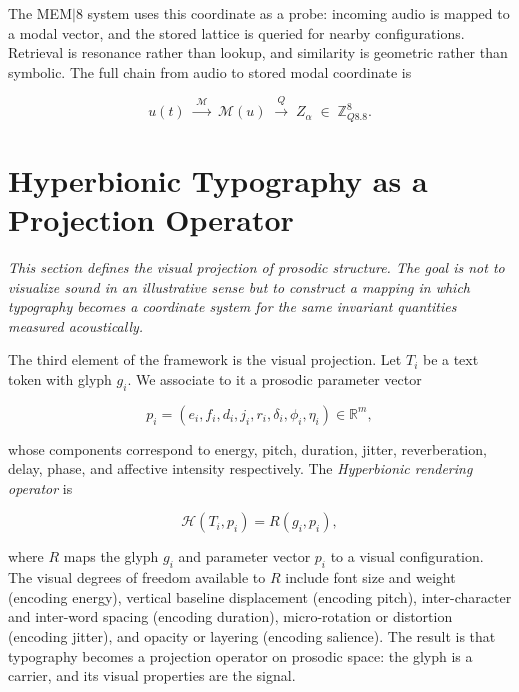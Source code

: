 \documentclass[12pt, a4paper]{article}
\begin{document}
The MEM$|$8 system uses this coordinate as a probe: incoming audio is mapped to a modal vector, and the stored lattice is queried for nearby configurations. Retrieval is resonance rather than lookup, and similarity is geometric rather than symbolic. The full chain from audio to stored modal coordinate is

\begin{equation}
u(t) \;\xrightarrow{\;\mathcal{M}\;}\; \mathcal{M}(u) \;\xrightarrow{\;Q\;}\; Z_\alpha \;\in\; \mathbb{Z}_{Q8.8}^8.
\label{eq:chain}
\end{equation}

\section{Hyperbionic Typography as a Projection Operator}

\noindent\textit{This section defines the visual projection of prosodic structure. The goal is not to visualize sound in an illustrative sense but to construct a mapping in which typography becomes a coordinate system for the same invariant quantities measured acoustically.}


The third element of the framework is the visual projection. Let $T_i$ be a text token with glyph $g_i$. We associate to it a prosodic parameter vector

\begin{equation}
p_i = (e_i, f_i, d_i, j_i, r_i, \delta_i, \phi_i, \eta_i) \in \mathbb{R}^m,
\label{eq:pi}
\end{equation}

whose components correspond to energy, pitch, duration, jitter, reverberation, delay, phase, and affective intensity respectively. The \emph{Hyperbionic rendering operator} is

\begin{equation}
\mathcal{H}(T_i, p_i) = R(g_i, p_i),
\label{eq:H}
\end{equation}

where $R$ maps the glyph $g_i$ and parameter vector $p_i$ to a visual configuration. The visual degrees of freedom available to $R$ include font size and weight (encoding energy), vertical baseline displacement (encoding pitch), inter-character and inter-word spacing (encoding duration), micro-rotation or distortion (encoding jitter), and opacity or layering (encoding salience). The result is that typography becomes a projection operator on prosodic space: the glyph is a carrier, and its visual properties are the signal.
\end{document}
